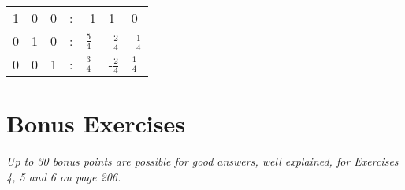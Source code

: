 \documentclass[11pt]{article}
\begin{document}
\begin{center}
\begin{tabular}{rrrllll}
 1  &  0  &  0  &  :  &  -1                 &  1                   &  0                   \\
 0  &  1  &  0  &  :  &  \( \frac{5}{4} \)  &  -\( \frac{2}{4} \)  &  -\( \frac{1}{4} \)  \\
 0  &  0  &  1  &  :  &  \( \frac{3}{4} \)  &  -\( \frac{2}{4} \)  &  \( \frac{1}{4} \)   \\
\end{tabular}
\end{center}


\section*{Bonus Exercises}
\label{sec-4}


\emph{Up to 30 bonus points are possible for good answers, well explained, for Exercises 4, 5 and 6 on page 206.}
\end{document}
